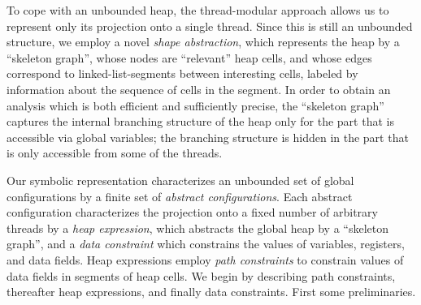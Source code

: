 To cope with an unbounded heap, the thread-modular approach allows us to
represent only its projection onto a single thread.
Since this is still an unbounded structure, we
employ a novel {\em shape abstraction}, which represents
the heap by a ``skeleton graph'', whose nodes
are ``relevant'' heap cells, and whose edges correspond
to linked-list-segments between interesting cells, labeled by information
about the sequence of cells in the segment.
In order to obtain an analysis which is both efficient and sufficiently
precise, the ``skeleton graph'' captures the internal branching structure
of the heap only for the part that is accessible via global variables; the
branching structure is hidden in the part that is only accessible from
some of the threads.


Our symbolic representation characterizes an unbounded set of
global configurations by a finite set of {\em abstract configurations}. Each
abstract configuration characterizes the projection onto a fixed number of
arbitrary threads by a {\em heap expression}, which 
abstracts  the global heap by a ``skeleton graph'', and a {\em data constraint}
which constrains the values of variables, registers, and data fields.
Heap expressions employ {\em path constraints}
to constrain values of data fields in
segments of heap cells.
We begin by describing path constraints, thereafter heap expressions, and
finally data constraints. First some preliminaries.

